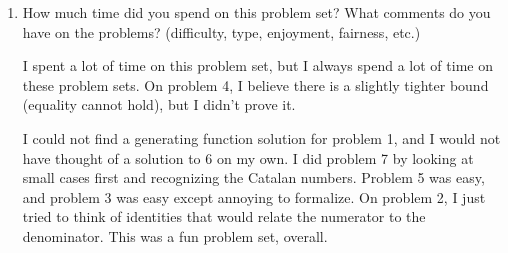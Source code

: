 \documentclass[12pt]{article}
\begin{document}
\begin{enumerate}[leftmargin=0cm,itemindent=.5cm,labelwidth=\itemindent,labelsep=0cm,align=left]
\begin{proof}
\begin{figure}[h]
\begin{center}
\end{center}
\end{figure}

To see this, look at the example of the graph on $8$ vertices.  After pairing 1 with $2k=6$ in this example, we are left with a circle of $2(k-1) = 4$ vertices on the right and a circle of $2(n-k) = 2$ vertices on the left.  The number of ways to complete this pairing is the product of the numbers of ways to successfully pair those two circles.  This also shows why $1$ must be paired with an even-labeled vertex, since otherwise each of the two smaller circles would have an odd number of vertices, meaning that the number of ways to pair it would be $0$.  Therefore,
$$
s_{n} = \sum_{k=1}^{n} t_{n,k} = \sum_{k=1}^{n} s_{k-1} s_{n-k}
$$
$$
\implies
s_{n+1} = \sum_{k=0}^{n} s_{k} s_{n-k}.
$$
So $s_n$ satisfies the same recurrence as the Catalan numbers.  Since there is $1$ successful way to pair a graph with no vertices, $s_0 = 1$.  Therefore, $s_n$ must be the Catalan numbers, so the probability of a successful pairing is
\begin{align*}
\dfrac{\dfrac{1}{n+1}\dbinom{2n}{n}}{\dfrac{(2n)!}{2^n n!}}
&=
\dfrac{(2n)!n!2^n}{(2n)!(n+1)n!^2} = \dfrac{2^n}{(n+1)!}.
\end{align*}

\end{proof}

\item How much time did you spend on this problem set?  What comments do you have on the problems? (difficulty, type, enjoyment, fairness, etc.)

I spent a lot of time on this problem set, but I always spend a lot of time on these problem sets.  On problem 4, I believe there is a slightly tighter bound (equality cannot hold), but I didn't prove it.

I could not find a generating function solution for problem 1, and I would not have thought of a solution to 6 on my own.  I did problem 7 by looking at small cases first and recognizing the Catalan numbers.  Problem 5 was easy, and problem 3 was easy except annoying to formalize.  On problem 2, I just tried to think of identities that would relate the numerator to the denominator.  This was a fun problem set, overall.

\end{enumerate}
\end{document}
